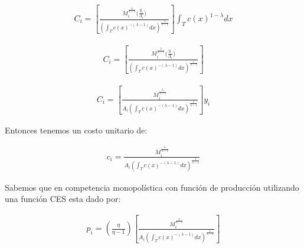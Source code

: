 \documentclass{article}
\theoremstyle{remark}
\theoremstyle{definition}
\begin{document}
\begin{align*}
    C_i=\left[\frac{M_i^{\frac{\lambda}{\lambda-1}}\bigl(\frac{y_i}{A_i}\bigr)}
     {\left(\int_{T}c(x)^{-(\lambda-1)}dx\right)^{\frac{\lambda}{\lambda-1}}}
\right]\int_T c(x)^{1-\lambda}dx
\end{align*}

\begin{align*}
    C_i=\left[\frac{M_i^{\frac{\lambda}{\lambda-1}}\bigl(\frac{y_i}{A_i}\bigr)}
     {\left(\int_{T}c(x)^{-(\lambda-1)}dx\right)^{\frac{1}{\lambda-1}}}
\right]
\end{align*}

\begin{align*}
    C_i=\left[\frac{M_i^{\frac{\lambda}{\lambda-1}}}
     {A_i\left(\int_{T}c(x)^{-(\lambda-1)}dx\right)^{\frac{1}{\lambda-1}}}
\right]y_i
\end{align*}

Entonces tenemos un costo unitario de:

\begin{align*}
    c_i=\frac{M_i^{\frac{\lambda}{\lambda-1}}}
     {A_i\left(\int_{T}c(x)^{-(\lambda-1)}dx\right)^{\frac{1}{\lambda-1}}}
\end{align*}

Sabemos que en competencia monopol\'istica con funci\'on de producci\'on utilizando una funci\'on CES esta dado por:

\begin{align*}
    p_i=\left(\frac{\eta}{\eta -1}\right)\left[\frac{M_i^{\frac{\lambda}{\lambda-1}}}
     {A_i\left(\int_{T}c(x)^{-(\lambda-1)}dx\right)^{\frac{1}{\lambda-1}}}\right]
\end{align*}
\end{document}
